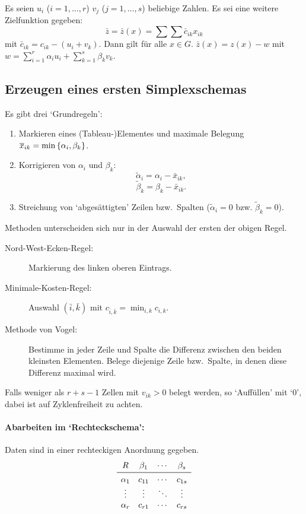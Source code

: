     \begin{theorem}
        Es seien $u_i$ ($i=1,\ldots,r$) $v_j$ ($j=1,\ldots,s$) beliebige Zahlen. Es sei eine weitere Zielfunktion gegeben:
        $$
        \bar z = \bar z (x) = \sum\sum{\bar c_{ik}x_{ik}}
        $$
        mit $\bar c_{ik}=c_{ik}-(u_i+v_k)$. Dann gilt für alle $x\in G$.
        $\bar z (x)=z(x) - w$ mit $w=\sum_{i=1}^r{\alpha_i u_i}+\sum_{k=1}^s{\beta_k v_k}$.
    \end{theorem}

    \subsection{Erzeugen eines ersten Simplexschemas}

    Es gibt drei `Grundregeln':
    \begin{enumerate}
            \item Markieren eines (Tableau-)Elementes und maximale Belegung $\bar x_{ik}=\min\set{\alpha_i,\beta_k}$.
            \item Korrigieren von $\alpha_i$ und $\beta_k$:
        $$ \tilde \alpha_i = \alpha_i-\bar x_{ik}, $$
        $$ \tilde \beta_k = \beta_k - \bar x_{ik}. $$
            \item Streichung von `abgesättigten' Zeilen bzw.\ Spalten ($\tilde \alpha_i=0$ bzw. $\tilde \beta_k=0$). 
    \end{enumerate}
    Methoden unterscheiden sich nur in der Auswahl der ersten der obigen Regel.

    \begin{description}%
            \item[Nord-West-Ecken-Regel:] Markierung des linken oberen Eintrags.
            \item[Minimale-Kosten-Regel:] Auswahl $(\bar i,\bar k)$ mit $c_{\bar i,\bar k}=\min_{i,k}{c_{i,k}}$.
            \item[Methode von Vogel:] Bestimme in jeder Zeile und Spalte die Differenz zwischen den beiden kleinsten Elementen. Belege diejenige Zeile bzw.\ Spalte, in denen diese Differenz maximal wird.
    \end{description}

    \begin{remark}
        Falls weniger als $r+s-1$ Zellen mit $v_{ik}>0$ belegt werden, so `Auffüllen' mit `0', dabei ist auf Zyklenfreiheit zu achten.
    \end{remark}

    \paragraph{Abarbeiten im `Rechteckschema':}
    Daten sind in einer rechteckigen Anordnung gegeben.
    $$
    \begin{matrix}
        R & \beta_1 & \cdots & \beta_s\\
        \midrule
        \alpha_1 & c_{11} & \cdots & c_{1s}\\
        \vdots & \vdots & \ddots & \vdots\\
        \alpha_r & c_{r1} & \cdots & c_{rs}
    \end{matrix}
    $$

